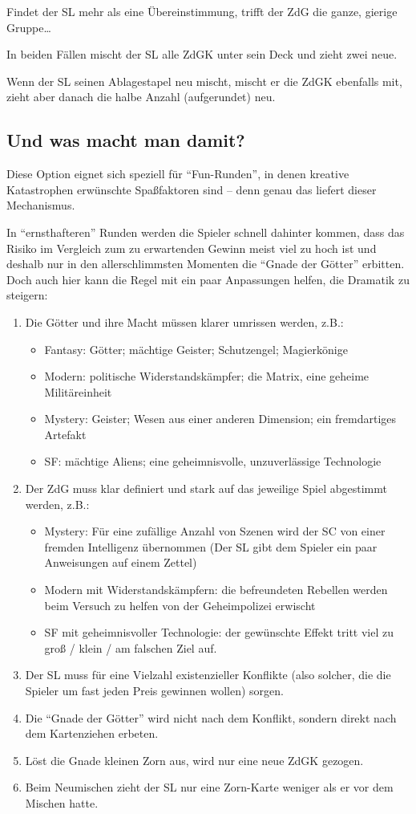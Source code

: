 Findet der SL mehr als eine Übereinstimmung, trifft der ZdG die ganze, gierige Gruppe\dots

In beiden Fällen mischt der SL alle ZdGK unter sein Deck und zieht zwei neue.

Wenn der SL seinen Ablagestapel neu mischt, mischt er die ZdGK ebenfalls mit, zieht aber danach die halbe Anzahl (aufgerundet) neu.

\subsection{Und was macht man damit?}

Diese Option eignet sich speziell für "`Fun-Runden"', in denen kreative Katastrophen erwünschte Spaßfaktoren sind -- denn genau das liefert dieser Mechanismus.

In "`ernsthafteren"' Runden werden die Spieler schnell dahinter kommen, dass das Risiko im Vergleich zum zu erwartenden Gewinn meist viel zu hoch ist und deshalb nur in den allerschlimmsten Momenten die "`Gnade der Götter"' erbitten. Doch auch hier kann die Regel mit ein paar Anpassungen helfen, die Dramatik zu steigern:
\begin{enumerate}
\item Die Götter und ihre Macht müssen klarer umrissen werden, z.B.:
\begin{itemize}
\item Fantasy: Götter; mächtige Geister; Schutzengel; Magierkönige
\item Modern: politische Widerstandskämpfer; die Matrix, eine geheime Militäreinheit
\item Mystery: Geister; Wesen aus einer anderen Dimension; ein fremdartiges Artefakt
\item SF: mächtige Aliens; eine geheimnisvolle, unzuverlässige Technologie
\end{itemize}
\item Der ZdG muss klar definiert und stark auf das jeweilige Spiel abgestimmt werden, z.B.:
\begin{itemize}
\item Mystery: Für eine zufällige Anzahl von Szenen wird der SC von einer fremden Intelligenz übernommen (Der SL gibt dem Spieler ein paar Anweisungen auf einem Zettel)
\item Modern mit Widerstandskämpfern: die befreundeten Rebellen werden beim Versuch zu helfen von der Geheimpolizei erwischt
\item SF mit geheimnisvoller Technologie: der gewünschte Effekt tritt viel zu groß / klein / am falschen Ziel auf.
\end{itemize}
\item Der SL muss für eine Vielzahl existenzieller Konflikte (also solcher, die die Spieler um fast jeden Preis gewinnen wollen) sorgen.
\item Die "`Gnade der Götter"' wird nicht nach dem Konflikt, sondern direkt nach dem Kartenziehen erbeten.
\item Löst die Gnade kleinen Zorn aus, wird nur eine neue ZdGK gezogen.
\item Beim Neumischen zieht der SL nur eine Zorn-Karte weniger als er vor dem Mischen hatte.
\end{enumerate}

